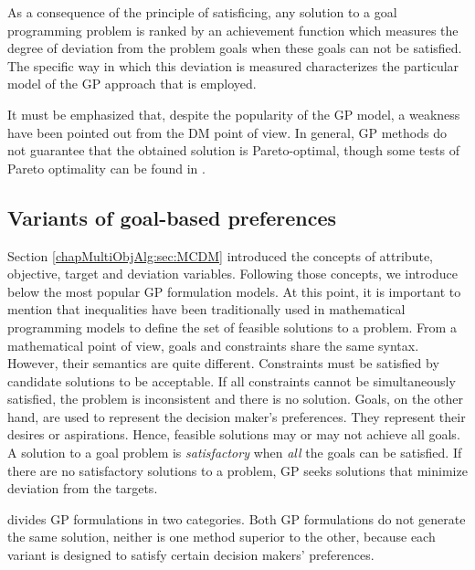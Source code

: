As a consequence of the principle of satisficing, any solution to a goal programming problem is ranked by an achievement function which measures the degree of deviation from the problem goals when these goals can not be satisfied. The specific way in which this deviation is measured characterizes the particular model of the GP approach that is employed.

It must be emphasized that, despite the popularity of the GP model, a weakness have been pointed out from the DM point of view. In general, GP methods do not guarantee that the obtained solution is Pareto-optimal, though some tests of Pareto optimality can be found in \citet{Miettinen1999, Larbani2007}. 

\subsection{Variants of goal-based preferences}
\label{chapMultiObjAlg:subsec:GP-variants}

Section \ref{chapMultiObjAlg:sec:MCDM} introduced the concepts of attribute, objective, target and deviation variables. Following those concepts, we introduce below the most popular GP formulation models. At this point, it is important to mention that inequalities have been traditionally used in mathematical programming models to define the set of feasible solutions to a problem. From a mathematical point of view, goals and constraints share the same syntax. However, their semantics are quite different. Constraints must be satisfied by candidate solutions to be acceptable. If all constraints cannot be simultaneously satisfied, the problem is inconsistent and there is no solution. Goals, on the other hand, are used to represent the decision maker's preferences. They represent their desires or aspirations. Hence, feasible solutions may or may not achieve all goals. A solution to a goal problem is \emph{satisfactory} when \emph{all} the goals can be satisfied. If there are no satisfactory solutions to a problem, GP seeks solutions that minimize deviation from the targets.

\cite{Romero1991} divides GP formulations in two categories. Both GP formulations do not generate the same solution, neither is one method superior to the other, because each variant is designed to satisfy certain decision makers' preferences. 

